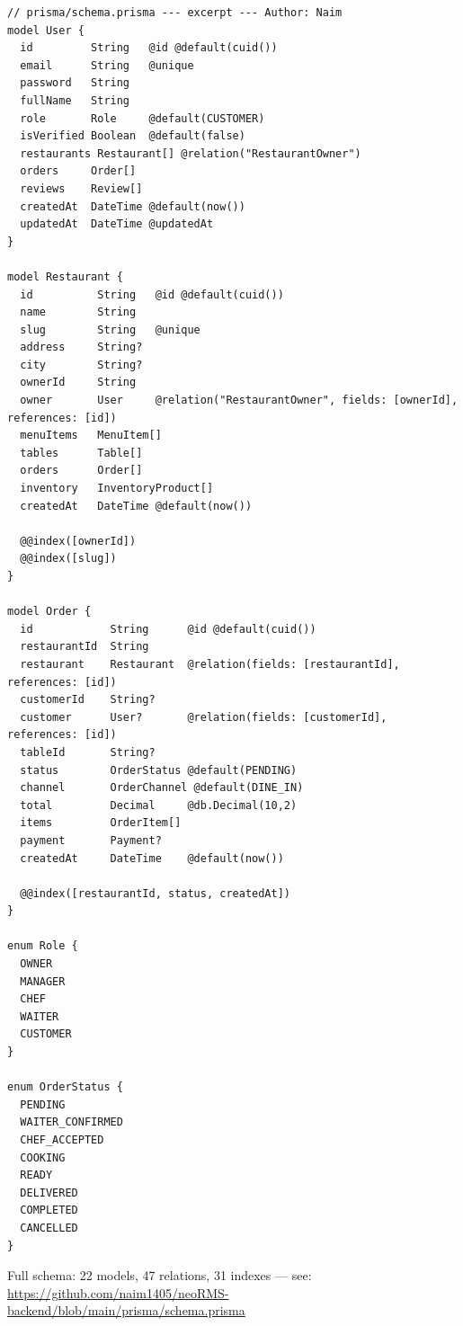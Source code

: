 \begin{lstlisting}[caption={Prisma schema excerpt --- multi-tenant core entities},label=lst:schema]
// prisma/schema.prisma --- excerpt --- Author: Naim
model User {
  id         String   @id @default(cuid())
  email      String   @unique
  password   String
  fullName   String
  role       Role     @default(CUSTOMER)
  isVerified Boolean  @default(false)
  restaurants Restaurant[] @relation("RestaurantOwner")
  orders     Order[]
  reviews    Review[]
  createdAt  DateTime @default(now())
  updatedAt  DateTime @updatedAt
}

model Restaurant {
  id          String   @id @default(cuid())
  name        String
  slug        String   @unique
  address     String?
  city        String?
  ownerId     String
  owner       User     @relation("RestaurantOwner", fields: [ownerId], references: [id])
  menuItems   MenuItem[]
  tables      Table[]
  orders      Order[]
  inventory   InventoryProduct[]
  createdAt   DateTime @default(now())

  @@index([ownerId])
  @@index([slug])
}

model Order {
  id            String      @id @default(cuid())
  restaurantId  String
  restaurant    Restaurant  @relation(fields: [restaurantId], references: [id])
  customerId    String?
  customer      User?       @relation(fields: [customerId], references: [id])
  tableId       String?
  status        OrderStatus @default(PENDING)
  channel       OrderChannel @default(DINE_IN)
  total         Decimal     @db.Decimal(10,2)
  items         OrderItem[]
  payment       Payment?
  createdAt     DateTime    @default(now())

  @@index([restaurantId, status, createdAt])
}

enum Role {
  OWNER
  MANAGER
  CHEF
  WAITER
  CUSTOMER
}

enum OrderStatus {
  PENDING
  WAITER_CONFIRMED
  CHEF_ACCEPTED
  COOKING
  READY
  DELIVERED
  COMPLETED
  CANCELLED
}
\end{lstlisting}

Full schema: 22 models, 47 relations, 31 indexes --- see: \url{https://github.com/naim1405/neoRMS-backend/blob/main/prisma/schema.prisma}
